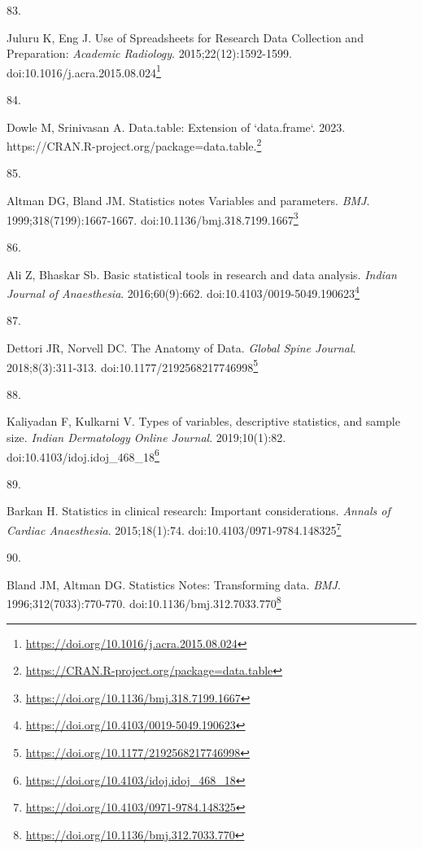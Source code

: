\documentclass[
  a4paper,
]{book}
\newlength{\cslhangindent}
\newlength{\csllabelwidth}
\newlength{\cslentryspacingunit} %
\newenvironment{CSLReferences}[2] %
 {%
  \setlength{\parindent}{0pt}
  \ifodd #1
  \let\oldpar\par
  \def\par{\hangindent=\cslhangindent\oldpar}
  \fi
  \setlength{\parskip}{#2\cslentryspacingunit}
 }%
 {}
\newcommand{\CSLLeftMargin}[1]{\parbox[t]{\csllabelwidth}{#1}}
\newcommand{\CSLRightInline}[1]{\parbox[t]{\linewidth - \csllabelwidth}{#1}\break}
\renewcommand{\href}[2]{#2\footnote{\url{#1}}}
\begin{document}
\begin{CSLReferences}{0}{0}
\leavevmode{}%
\CSLLeftMargin{83. }%
\CSLRightInline{Juluru K, Eng J. Use of Spreadsheets for Research Data Collection and Preparation: \emph{Academic Radiology}. 2015;22(12):1592-1599. doi:\href{https://doi.org/10.1016/j.acra.2015.08.024}{10.1016/j.acra.2015.08.024}}

\leavevmode{}%
\CSLLeftMargin{84. }%
\CSLRightInline{Dowle M, Srinivasan A. Data.table: Extension of `data.frame`. 2023. \href{https://CRAN.R-project.org/package=data.table}{https://CRAN.R-project.org/package=data.table.}}

\leavevmode{}%
\CSLLeftMargin{85. }%
\CSLRightInline{Altman DG, Bland JM. Statistics notes Variables and parameters. \emph{BMJ}. 1999;318(7199):1667-1667. doi:\href{https://doi.org/10.1136/bmj.318.7199.1667}{10.1136/bmj.318.7199.1667}}

\leavevmode{}%
\CSLLeftMargin{86. }%
\CSLRightInline{Ali Z, Bhaskar Sb. Basic statistical tools in research and data analysis. \emph{Indian Journal of Anaesthesia}. 2016;60(9):662. doi:\href{https://doi.org/10.4103/0019-5049.190623}{10.4103/0019-5049.190623}}

\leavevmode{}%
\CSLLeftMargin{87. }%
\CSLRightInline{Dettori JR, Norvell DC. The Anatomy of Data. \emph{Global Spine Journal}. 2018;8(3):311-313. doi:\href{https://doi.org/10.1177/2192568217746998}{10.1177/2192568217746998}}

\leavevmode{}%
\CSLLeftMargin{88. }%
\CSLRightInline{Kaliyadan F, Kulkarni V. Types of variables, descriptive statistics, and sample size. \emph{Indian Dermatology Online Journal}. 2019;10(1):82. doi:\href{https://doi.org/10.4103/idoj.idoj_468_18}{10.4103/idoj.idoj\_468\_18}}

\leavevmode{}%
\CSLLeftMargin{89. }%
\CSLRightInline{Barkan H. Statistics in clinical research: Important considerations. \emph{Annals of Cardiac Anaesthesia}. 2015;18(1):74. doi:\href{https://doi.org/10.4103/0971-9784.148325}{10.4103/0971-9784.148325}}

\leavevmode{}%
\CSLLeftMargin{90. }%
\CSLRightInline{Bland JM, Altman DG. Statistics Notes: Transforming data. \emph{BMJ}. 1996;312(7033):770-770. doi:\href{https://doi.org/10.1136/bmj.312.7033.770}{10.1136/bmj.312.7033.770}}


\end{CSLReferences}
\end{document}
